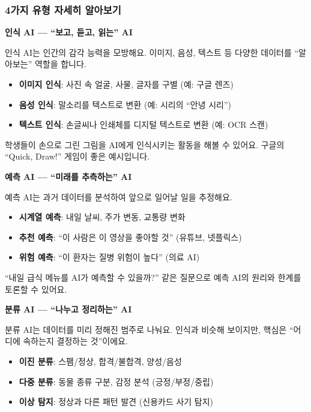 \documentclass[11pt,a4paper]{article}
\begin{document}
\subsubsection{4가지 유형 자세히 알아보기}

\textbf{ 인식 AI — ``보고, 듣고, 읽는'' AI}

인식 AI는 인간의 감각 능력을 모방해요. 이미지, 음성, 텍스트 등 다양한 데이터를 ``알아보는'' 역할을 합니다.

\begin{itemize}[leftmargin=*]
    \item \textbf{이미지 인식}: 사진 속 얼굴, 사물, 글자를 구별 (예: 구글 렌즈)
    \item \textbf{음성 인식}: 말소리를 텍스트로 변환 (예: 시리의 ``안녕 시리'')
    \item \textbf{텍스트 인식}: 손글씨나 인쇄체를 디지털 텍스트로 변환 (예: OCR 스캔)
\end{itemize}

\begin{tipbox}
학생들이 손으로 그린 그림을 AI에게 인식시키는 활동을 해볼 수 있어요. 구글의 ``Quick, Draw!'' 게임이 좋은 예시입니다.
\end{tipbox}

\textbf{ 예측 AI — ``미래를 추측하는'' AI}

예측 AI는 과거 데이터를 분석하여 앞으로 일어날 일을 추정해요.

\begin{itemize}[leftmargin=*]
    \item \textbf{시계열 예측}: 내일 날씨, 주가 변동, 교통량 변화
    \item \textbf{추천 예측}: ``이 사람은 이 영상을 좋아할 것'' (유튜브, 넷플릭스)
    \item \textbf{위험 예측}: ``이 환자는 질병 위험이 높다'' (의료 AI)
\end{itemize}

\begin{tipbox}
``내일 급식 메뉴를 AI가 예측할 수 있을까?'' 같은 질문으로 예측 AI의 원리와 한계를 토론할 수 있어요.
\end{tipbox}

\textbf{ 분류 AI — ``나누고 정리하는'' AI}

분류 AI는 데이터를 미리 정해진 범주로 나눠요. 인식과 비슷해 보이지만, 핵심은 ``어디에 속하는지 결정하는 것''이에요.

\begin{itemize}[leftmargin=*]
    \item \textbf{이진 분류}: 스팸/정상, 합격/불합격, 양성/음성
    \item \textbf{다중 분류}: 동물 종류 구분, 감정 분석 (긍정/부정/중립)
    \item \textbf{이상 탐지}: 정상과 다른 패턴 발견 (신용카드 사기 탐지)
\end{itemize}
\end{document}
